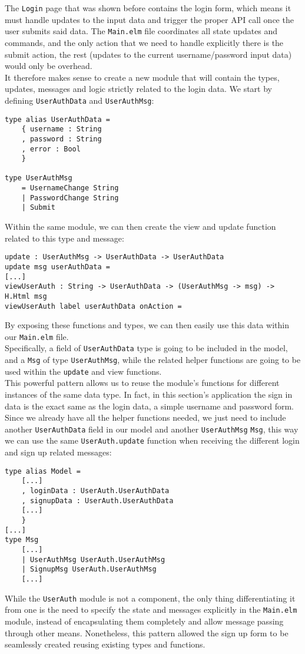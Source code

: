 The \texttt{Login} page that was shown before contains the login form, which means it must handle updates to the input data and trigger the proper API call once the user submits said data. The \texttt{Main.elm} file coordinates all state updates and commands, and the only action that we need to handle explicitly there is the submit action, the rest (updates to the current username/password input data) would only be overhead.\\
It therefore makes sense to create a new module that will contain the types, updates, messages and logic strictly related to the login data. We start by defining \texttt{UserAuthData} and \texttt{UserAuthMsg}:
\begin{verbatim}
type alias UserAuthData =
    { username : String
    , password : String
    , error : Bool
    }

type UserAuthMsg
    = UsernameChange String
    | PasswordChange String
    | Submit
\end{verbatim}

Within the same module, we can then create the view and update function related to this type and message:
\begin{verbatim}
update : UserAuthMsg -> UserAuthData -> UserAuthData
update msg userAuthData =
[...]
viewUserAuth : String -> UserAuthData -> (UserAuthMsg -> msg) -> H.Html msg
viewUserAuth label userAuthData onAction =
\end{verbatim}

By exposing these functions and types, we can then easily use this data within our \texttt{Main.elm} file.\\
Specifically, a field of \texttt{UserAuthData} type is going to be included in the model, and a \texttt{Msg} of type \texttt{UserAuthMsg}, while the related helper functions are going to be used within the \texttt{update} and view functions.\\

This powerful pattern allows us to reuse the module's functions for different instances of the same data type. In fact, in this section's application the sign in data is the exact same as the login data, a simple username and password form.\\ Since we already have all the helper functions needed, we just need to include another \texttt{UserAuthData} field in our model and another \texttt{UserAuthMsg}  \texttt{Msg}, this way we can use the same \texttt{UserAuth.update} function when receiving the different login and sign up related messages:
\begin{verbatim}  
type alias Model =
    [...]
    , loginData : UserAuth.UserAuthData
    , signupData : UserAuth.UserAuthData
    [...]
    }
[...]
type Msg
    [...]
    | UserAuthMsg UserAuth.UserAuthMsg
    | SignupMsg UserAuth.UserAuthMsg
    [...]
\end{verbatim}

While the \texttt{UserAuth} module is not a component, the only thing differentiating it from one is the need to specify the state and messages explicitly in the \texttt{Main.elm} module, instead of encapsulating them completely and allow message passing through other means. Nonetheless, this pattern allowed the sign up form to be seamlessly created reusing existing types and functions.